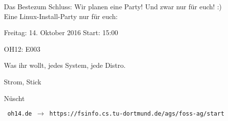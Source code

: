 \begin{frame}{Das Beste}{zum Schluss:}
	Wir planen eine Party! Und zwar nur für euch! :)\\
	Eine Linux-Install-Party nur für euch:\\ 
	\begin{center}
	\begin{description}[<+->]
		\item[Wann?] Freitag: 14. Oktober 2016 Start: 15:00
		\item[Wo?] OH12: E003
		\item[Was?] Was ihr wollt, jedes System, jede Distro.
		\item[Womit?] Strom, Stick    
		\item[Koscht?] Nüscht
	\end{description}
	\end{center}

	{\onslide<5-> \texttt{  oh14.de $\rightarrow$ https://fsinfo.cs.tu-dortmund.de/ags/foss-ag/start}}
\end{frame}
